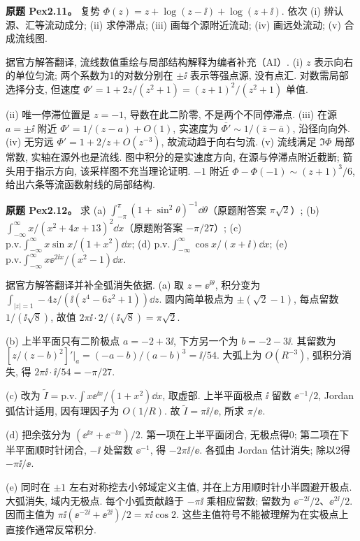 \begin{exercise}\label{ass:pex2-11}
\textbf{原题 Pex2.11。} 复势 $\Phi(z)=z+\log(z-\ii)+\log(z+\ii)$. 依次 (i) 辨认源、汇等流动成分; (ii) 求停滞点; (iii) 画每个源附近流动; (iv) 画远处流动; (v) 合成流线图.
\end{exercise}
\begin{solution}
据官方解答翻译, 流线数值重绘与局部结构解释为编者补充（AI）. (i) $z$ 表示向右的单位匀流; 两个系数为1的对数分别在 $\pm\ii$ 表示等强点源, 没有点汇. 对数需局部选择分支, 但速度 $\Phi'=1+2z/(z^2+1)=(z+1)^2/(z^2+1)$ 单值.

(ii) 唯一停滞位置是 $z=-1$, 导数在此二阶零, 不是两个不同停滞点. (iii) 在源 $a=\pm\ii$ 附近 $\Phi'=1/(z-a)+O(1)$, 实速度为 $\overline{\Phi'}\sim1/(\bar z-\bar a)$, 沿径向向外. (iv) 无穷远 $\Phi'=1+2/z+O(z^{-3})$, 故流动趋于向右匀流. (v) 流线满足 $\Im\Phi$ 局部常数, 实轴在源外也是流线. 图中积分的是实速度方向, 在源与停滞点附近截断; 箭头用于指示方向, 该采样图不充当理论证明. $-1$ 附近 $\Phi-\Phi(-1)\sim(z+1)^3/6$, 给出六条等流函数射线的局部结构.

\end{solution}
\begin{exercise}\label{ass:pex2-12}
\textbf{原题 Pex2.12。} 求 (a) $\int_{-\pi}^{\pi}(1+\sin^2\theta)^{-1}\dd\theta$（原题附答案 $\pi\sqrt2$）; (b) $\int_{-\infty}^{\infty}x/(x^2+4x+13)^2\dd x$（原题附答案 $-\pi/27$）; (c) $\mathrm{p.v.}\int_{-\infty}^{\infty}x\sin x/(1+x^2)\dd x$; (d) $\mathrm{p.v.}\int_{-\infty}^{\infty}\cos x/(x+\ii)\dd x$; (e) $\mathrm{p.v.}\int_{-\infty}^{\infty}x\ee^{2\ii x}/(x^2-1)\dd x$.
\end{exercise}
\begin{solution}
据官方解答翻译并补全弧消失依据. (a) 取 $z=\ee^{\ii\theta}$, 积分变为 $\int_{|z|=1}-4z/(\ii(z^4-6z^2+1))\dd z$. 圆内简单极点为 $\pm(\sqrt2-1)$, 每点留数 $1/(\ii\sqrt8)$, 故值 $2\pi\ii\cdot2/(\ii\sqrt8)=\pi\sqrt2$.

(b) 上半平面只有二阶极点 $a=-2+3\ii$, 下方另一个为 $b=-2-3\ii$. 其留数为 $[z/(z-b)^2]'|_a=(-a-b)/(a-b)^3=\ii/54$. 大弧上为 $O(R^{-3})$, 弧积分消失, 得 $2\pi\ii\cdot\ii/54=-\pi/27$.

(c) 改为 $\widetilde I=\mathrm{p.v.}\int x\ee^{\ii x}/(1+x^2)\dd x$, 取虚部. 上半平面极点 $\ii$ 留数 $\ee^{-1}/2$, Jordan 弧估计适用, 因有理因子为 $O(1/R)$. 故 $\widetilde I=\pi\ii/\ee$, 所求 $\pi/\ee$.

(d) 把余弦分为 $(\ee^{\ii x}+\ee^{-\ii x})/2$. 第一项在上半平面闭合, 无极点得0; 第二项在下半平面顺时针闭合, $-\ii$ 处留数 $\ee^{-1}$, 得 $-2\pi\ii/\ee$. 各弧由 Jordan 估计消失; 除以2得 $-\pi\ii/\ee$.

(e) 同时在 $\pm1$ 左右对称挖去小邻域定义主值, 并在上方用顺时针小半圆避开极点. 大弧消失, 域内无极点. 每个小弧贡献趋于 $-\pi\ii$ 乘相应留数; 留数为 $\ee^{-2\ii}/2$、$\ee^{2\ii}/2$. 因而主值为 $\pi\ii(\ee^{-2\ii}+\ee^{2\ii})/2=\pi\ii\cos2$. 这些主值符号不能被理解为在实极点上直接作通常反常积分.
\end{solution}

